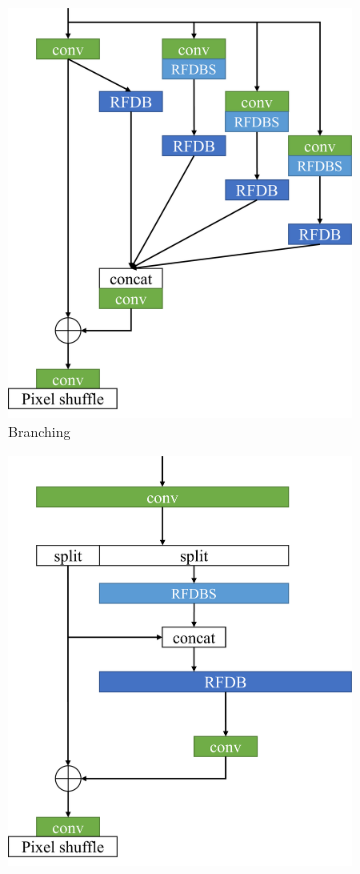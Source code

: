 \documentclass[10pt,twocolumn,letterpaper]{article}
\begin{document}
\begin{figure}
\begin{subfigure}[b]{0.49\linewidth}
        \includegraphics[width=\textwidth]{../Branching.pdf}
        \caption{Branching}
        \label{fig:Branching}
    \end{subfigure}
    \begin{subfigure}[b]{0.49\linewidth}
		\centering
        \includegraphics[width=\textwidth]{../Re-parametrization.pdf}

\end{subfigure}
\end{figure}
\end{document}
